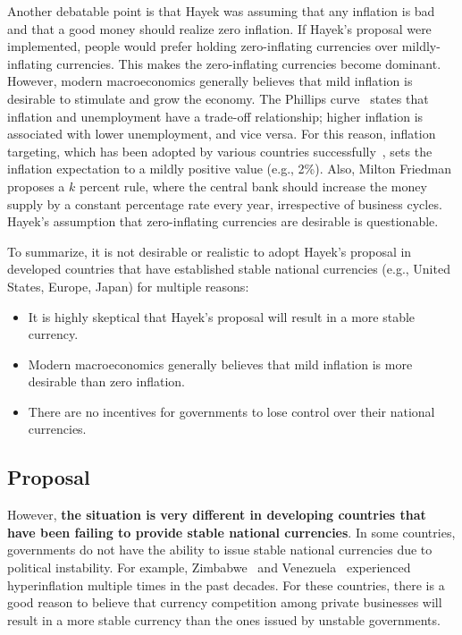 \documentclass[dvipdfmx,a4paper]{article}
\begin{document}
Another debatable point is that Hayek was assuming that any inflation is bad and that a good money should realize zero inflation. If Hayek's proposal were implemented, people would prefer holding zero-inflating currencies over mildly-inflating currencies. This makes the zero-inflating currencies become dominant. However, modern macroeconomics generally believes that mild inflation is desirable to stimulate and grow the economy. The Phillips curve~\cite{stock2008phillips} states that inflation and unemployment have a trade-off relationship; higher inflation is associated with lower unemployment, and vice versa. For this reason, inflation targeting, which has been adopted by various countries successfully~\cite{svensson2010inflation}, sets the inflation expectation to a mildly positive value (e.g., 2\%). Also, Milton Friedman proposes a $k$ percent rule, where the central bank should increase the money supply by a constant percentage rate every year, irrespective of business cycles. Hayek's assumption that zero-inflating currencies are desirable is questionable.

To summarize, it is not desirable or realistic to adopt Hayek's proposal in developed countries that have established stable national currencies (e.g., United States, Europe, Japan) for multiple reasons:

\begin{itemize}
\item It is highly skeptical that Hayek's proposal will result in a more stable currency.
\item Modern macroeconomics generally believes that mild inflation is more desirable than zero inflation.
\item There are no incentives for governments to lose control over their national currencies.
\end{itemize}

\subsection{Proposal}

However, \textbf{the situation is very different in developing countries that have been failing to provide stable national currencies}. In some countries, governments do not have the ability to issue stable national currencies due to political instability. For example, Zimbabwe~\cite{imf2009zimbabwe,kramarenko2010zimbabwe,hanke2009measurement,nkomazana2014overview,coomer2011hyperinflation} and Venezuela~\cite{reilly2020hyperinflation,pittaluga2021political,mondal2023venezuela,miller2019hyperinflation,huertas2019hyperinflation,manzano2014venezuela,kulesza2017inflation} experienced hyperinflation multiple times in the past decades. For these countries, there is a good reason to believe that currency competition among private businesses will result in a more stable currency than the ones issued by unstable governments.
\end{document}
